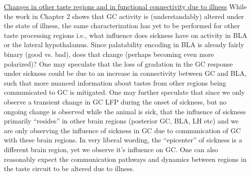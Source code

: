 \begin{refsection}
\smallskip
\noindent \underline{Changes in other taste regions and in functional connectivity due to illness} While the work in Chapter 2 shows that GC activity is (understandably) altered under the state of illness, the same characterization has yet to be performed for other taste processing regions i.e., what influence does sickness have on activity in BLA or the lateral hypothalamus. Since palatability encoding in BLA is already fairly binary (good vs. bad), does that change (perhaps becoming even more polarized)? One may speculate that the loss of gradation in the GC response under sickness could be due to an increase in connectivity between GC and BLA, such that more nuanced information about tastes from other regions being communicated to GC is mitigated. One may further speculate that since we only observe a transient change in GC LFP during the onset of sickness, but no ongoing change is observed while the animal is sick, that the influence of sickness primarily “resides” in other brain regions (posterior GC, BLA, LH etc) and we are only observing the influence of sickness in GC due to communication of GC with these brain regions. In very liberal wording, the “epicenter” of sickness is a different brain region, yet we observe it’s influence on GC. One can also reasonably expect the communication pathways and dynamics between regions in the taste circuit to be altered due to illness.


\end{refsection}
